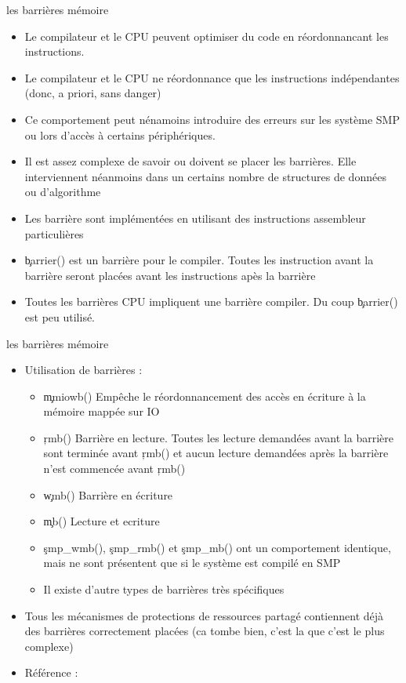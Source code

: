 \begin{frame}[fragile=singleslide]{les barrières mémoire}
  \begin{itemize} 
  \item  Le  compilateur  et  le  CPU peuvent  optimiser  du  code  en
    réordonnancant les instructions.
  \item Le compilateur et le  CPU ne réordonnance que les instructions
    indépendantes (donc, a priori, sans danger)
  \item Ce comportement peut  nénamoins introduire des erreurs sur les
    système SMP ou lors d'accès à certains périphériques.
  \item  Il est  assez complexe  de savoir  ou doivent  se  placer les
    barrières. Elle interviennent néanmoins dans un certains nombre de
    structures de données ou d'algorithme
  \item Les  barrière sont implémentées en  utilisant des instructions
    assembleur particulières
  \item \c{barrier()}  est un barrière  pour le compiler.   Toutes les
    instruction   avant   la  barrière   seront   placées  avant   les
    instructions apès la barrière
  \item Toutes les barrières  CPU impliquent une barrière compiler. Du
    coup \c{barrier()} est peu utilisé.
  \end{itemize}
\end{frame}

\begin{frame}[fragile=singleslide]{les barrières mémoire}
  \begin{itemize} 
  \item Utilisation de barrières :
    \begin{itemize}
    \item  \c{mmiowb()}  Empêche  le  réordonnancement  des  accès  en
      écriture à la mémoire mappée sur IO
    \item \c{rmb()} Barrière en  lecture. Toutes les lecture demandées
      avant la barrière sont terminée avant \c{rmb()} et aucun lecture
      demandées après la barrière n'est commencée avant \c{rmb()}
    \item \c{wmb()} Barrière en écriture
    \item \c{mb()} Lecture et ecriture
    \item   \c{smp_wmb()},  \c{smp_rmb()}   et  \c{smp_mb()}   ont  un
      comportement  identique,  mais  ne  sont présentent  que  si  le
      système est compilé en SMP
    \item Il existe d'autre types de barrières très spécifiques
    \end{itemize} 
  \item  Tous  les  mécanismes  de protections  de  ressources  partagé
    contiennent  déjà  des barrières  correctement  placées (ca  tombe
    bien, c'est la que c'est le plus complexe)
   
  \item Référence : 
  \end{itemize} 
\end{frame} 
